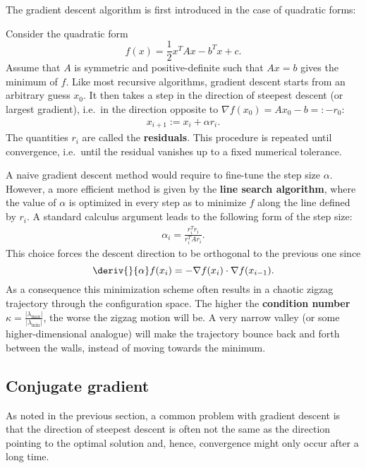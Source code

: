     The gradient descent algorithm is first introduced in the case of quadratic forms:
    \begin{method}
        Consider the quadratic form \[f(x) = \frac{1}{2}x^TAx - b^Tx + c.\] Assume that $A$ is symmetric and positive-definite such that $Ax=b$ gives the minimum of $f$. Like most recursive algorithms, gradient descent starts from an arbitrary guess $x_0$. It then takes a step in the direction of steepest descent (or largest gradient), i.e.~in the direction opposite to $\nabla f(x_0) = Ax_0-b =: -r_0$:
        \begin{gather}
            x_{i+1} := x_i + \alpha r_i.
        \end{gather}
        The quantities $r_i$ are called the \textbf{residuals}. This procedure is repeated until convergence, i.e.~until the residual vanishes up to a fixed numerical tolerance.

        A naive gradient descent method would require to fine-tune the step size $\alpha$. However, a more efficient method is given by the \textbf{line search algorithm}, where the value of $\alpha$ is optimized in every step as to minimize $f$ along the line defined by $r_i$. A standard calculus argument leads to the following form of the step size:
        \begin{gather}
            \alpha_i = \frac{r_i^Tr_i}{r_i^TAr_i}.
        \end{gather}
        This choice forces the descent direction to be orthogonal to the previous one since \[\deriv{}{\alpha}f(x_i) = -\nabla f(x_i)\cdot\nabla f(x_{i-1}).\] As a consequence this minimization scheme often results in a chaotic zigzag trajectory through the configuration space. The higher the \textbf{condition number} $\kappa=\frac{|\lambda_{\max}|}{|\lambda_{\min}|}$, the worse the zigzag motion will be. A very narrow valley (or some higher-dimensional analogue) will make the trajectory bounce back and forth between the walls, instead of moving towards the minimum.
    \end{method}

\subsection{Conjugate gradient}

    As noted in the previous section, a common problem with gradient descent is that the direction of steepest descent is often not the same as the direction pointing to the optimal solution and, hence, convergence might only occur after a long time.

